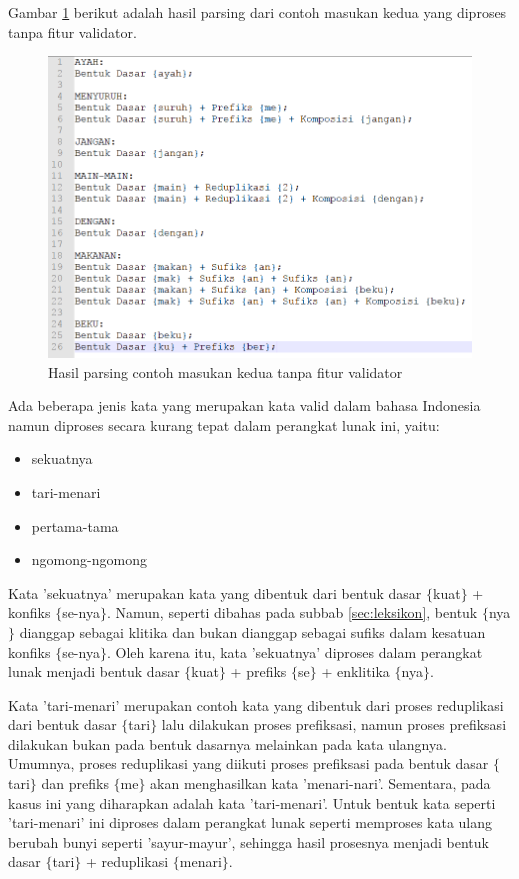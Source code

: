 Gambar \ref{hasil-parsing-tanpa-validator} berikut adalah hasil parsing dari contoh masukan kedua yang diproses tanpa fitur validator.

\begin{figure}[H]
\centering
\includegraphics[scale=0.7]{Gambar/hasil-parsing-tanpa-validator}
\caption{Hasil parsing contoh masukan kedua tanpa fitur validator} 
\label{hasil-parsing-tanpa-validator}
\end{figure}

Ada beberapa jenis kata yang merupakan kata valid dalam bahasa Indonesia namun diproses secara kurang tepat dalam perangkat lunak ini, yaitu:
\begin{itemize}
	\item sekuatnya
	\item tari-menari
	\item pertama-tama
	\item ngomong-ngomong
\end{itemize}

Kata 'sekuatnya' merupakan kata yang dibentuk dari bentuk dasar $\lbrace$kuat$\rbrace$ + konfiks $\lbrace$se-nya$\rbrace$. Namun, seperti dibahas pada subbab \ref{sec:leksikon}, bentuk $\lbrace$nya$\rbrace$ dianggap sebagai klitika dan bukan dianggap sebagai sufiks dalam kesatuan konfiks $\lbrace$se-nya$\rbrace$. Oleh karena itu, kata 'sekuatnya' diproses dalam perangkat lunak menjadi bentuk dasar $\lbrace$kuat$\rbrace$ + prefiks $\lbrace$se$\rbrace$ + enklitika $\lbrace$nya$\rbrace$.

Kata 'tari-menari' merupakan contoh kata yang dibentuk dari proses reduplikasi dari bentuk dasar $\lbrace$tari$\rbrace$ lalu dilakukan proses prefiksasi, namun proses prefiksasi dilakukan bukan pada bentuk dasarnya melainkan pada kata ulangnya. Umumnya, proses reduplikasi yang diikuti proses prefiksasi pada bentuk dasar $\lbrace$tari$\rbrace$ dan prefiks $\lbrace$me$\rbrace$ akan menghasilkan kata 'menari-nari'. Sementara, pada kasus ini yang diharapkan adalah kata 'tari-menari'. Untuk bentuk kata seperti 'tari-menari' ini diproses dalam perangkat lunak seperti memproses kata ulang berubah bunyi seperti 'sayur-mayur', sehingga hasil prosesnya menjadi bentuk dasar $\lbrace$tari$\rbrace$ + reduplikasi $\lbrace$menari$\rbrace$.

